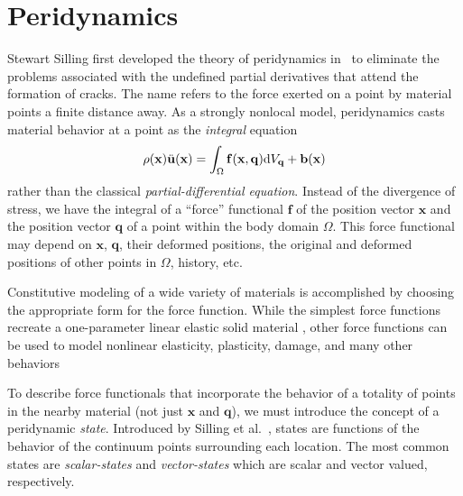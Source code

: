 \documentclass[preprint,review,12pt]{elsarticle}
\newcommand{\mathbi}[1]{\mathit{\mathbf{#1}}}
\begin{document}
\section{Peridynamics}
\label{sec:PDintro}
Stewart Silling first developed the theory of peridynamics in~\cite{silling2000reformulation} to eliminate the problems associated with the undefined partial derivatives that attend the formation of cracks. The name refers to the force exerted on a point by material points a finite distance away. As a strongly nonlocal model, peridynamics casts material behavior at a point as the \textit{integral} equation 
%
\begin{equation}
    \label{eq:PDCoPV}
    \rho(\mathbf{x})\ddot{\mathbf{u}}(\mathbf{x}) = \int_\Omega \mathbi{f}(\mathbf{x},\mathbf{q}) {\rm d}V_\mathbf{q}  + \mathbf{b}(\mathbf{x}) \notag
\end{equation}
%
rather than the classical \textit{partial-differential equation}.  Instead of the divergence of stress, we have the integral of a ``force'' functional $\mathbi{f}$ of the position vector $\mathbf{x}$ and the position vector $\mathbf{q}$ of a point within the body domain $\Omega$.  This force functional may depend on \(\mathbf{x}\), \(\mathbf{q}\), their deformed positions, the original and deformed positions of other points in \(\Omega\), history, etc.

Constitutive modeling of a wide variety of materials is accomplished by choosing the appropriate form for the force function.  While the simplest force functions recreate a one-parameter linear elastic solid material \cite{silling2000reformulation}, other force functions can be used to model nonlinear elasticity, plasticity, damage, and many other behaviors \cite{silling2005peridynamic, dayal2006kinetics, gerstle2007peridynamic, silling2007peridynamic, warren2009non, foster2010viscoplasticity,foster2011energy,taylor2013two,ogrady2014beams}

To describe force functionals that incorporate the behavior of a totality of points in the nearby material (not just $\mathbf{x}$ and $\mathbf{q}$), we must introduce the concept of a peridynamic \emph{state}.
Introduced by Silling et al.\ \cite{silling2007peridynamic}, states are functions of the behavior of the continuum points surrounding each location.  The most common states are \emph{scalar-states} and \emph{vector-states} which are scalar and vector valued, respectively.
\end{document}
